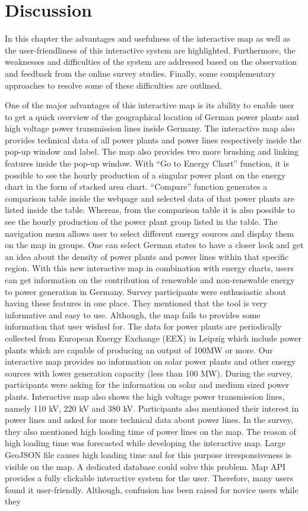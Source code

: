 \chapter{Discussion}
\label{chap:discussion}

In this chapter the advantages and usefulness of the interactive map as well as the user-friendliness of this interactive system are highlighted. Furthermore, the weaknesses and difficulties of the system are addressed based on the observation and feedback from the online survey studies. Finally, some complementary approaches to resolve some of these difficulties are outlined.

One of the major advantages of this interactive map is its ability to enable user to get a quick overview of the geographical location of German power plants and high voltage power transmission lines inside Germany.  The interactive map also provides technical data of all power plants and power lines respectively inside the pop-up window and label. The map also provides two more brushing and linking features inside the pop-up window. With “Go to Energy Chart” function, it is possible to see the hourly production of a singular power plant on the energy chart in the form of stacked area chart. “Compare” function generates a comparison table inside the webpage and selected data of that power plants are listed inside the table. Whereas, from the comparison table it is also possible to see the hourly production of the power plant group listed in the table. The navigation menu allows user to select different energy sources and display them on the map in groups. One can select German states to have a closer look and get an idea about the density of power plants and power lines within that specific region. With this new interactive map in combination with energy charts, users can get information on the contribution of renewable and non-renewable energy to power generation in Germany. Survey participants were enthusiastic about having these features in one place. They mentioned that the tool is very informative and easy to use. Although, the map fails to provides some information that user wished for. The data for power plants are periodically collected from European Energy Exchange (EEX) in Leipzig which include power plants which are capable of producing an output of 100MW or more. Our interactive map provides no information on solar power plants and other energy sources with lower generation capacity (less than 100 MW). During the survey, participants were asking for the information on solar and medium sized power plants. Interactive map also shows the high voltage power transmission lines, namely 110 kV, 220 kV and 380 kV. Participants also mentioned their interest in power lines and asked for more technical data about power lines. In the survey, they also mentioned high loading time of power lines on the map. The reason of high loading time was forecasted while developing the interactive map. Large GeoJSON file causes high loading time and for this purpose irresponsiveness is visible on the map. A dedicated database could solve this problem. Map API provides a fully clickable interactive system for the user. Therefore, many users found it user-friendly. Although, confusion has been raised for novice users while they 